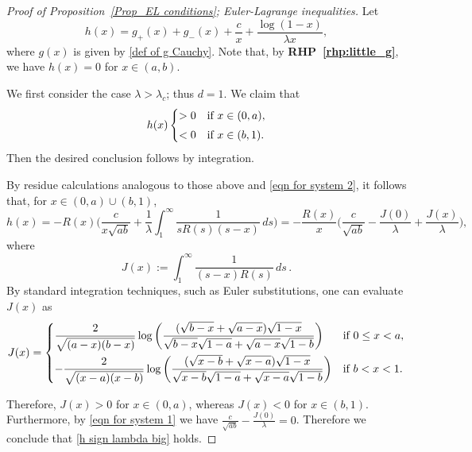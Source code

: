\documentclass{amsart}
\theoremstyle{plain}
\theoremstyle{remark}
\numberwithin{equation}{section}
\begin{document}
\begin{proof}[Proof of Proposition~\ref{Prop_EL conditions}; Euler-Lagrange inequalities] 


Let 
\begin{equation}
\label{eq:h_func}
    h(x) = g_+(x) + g_-(x) + \frac{c}{x} + \frac{\log(1-x)}{\lambda x},
\end{equation}
where $g(x)$ is given by \eqref{def of g Cauchy}. Note that, by \textbf{RHP~\ref{rhp:little_g}}, we have $h(x)=0$ for $x \in (a,b)$.

We first consider the case $\lambda > \lambda_c$; thus $d=1$.  
We claim that 
\begin{equation} \label{h sign lambda big}
h(x) \begin{cases}
>0 &\textup{if } x \in (0,a),
\smallskip 
\\
<0  &\textup{if } x \in (b,1).  
\end{cases}
\end{equation}
Then the desired conclusion follows by integration. 
 
By residue calculations analogous to those above and \eqref{eqn for system 2}, it follows that, for $x \in (0,a)\cup(b,1)$, 
\begin{equation}
  h(x) = -R(x)\bigg(\frac{c}{x\sqrt{ab}} +\frac{1}{\lambda}\int_1^\infty \frac{1}{sR(s)(s-x)}\, ds\bigg)= -\frac{R(x)}{x}\Big(\frac{c}{\sqrt{ab}} -\frac{J(0)}{\lambda} +\frac{  J(x) }{\lambda }  \Big), 
\end{equation}
where 
\begin{equation} \label{def of J}
J(x) := \int_1^\infty \frac{1}{(s-x)R(s)}\, ds\,.
\end{equation}
By standard integration techniques, such as Euler substitutions, one can evaluate $J(x)$ as 
\begin{equation}  \label{integral eval of J}
    J(x) = 
    \begin{cases}
    \displaystyle  
    \frac{2 }{\sqrt{(a-x)(b-x)}} \log\bigg( \frac{(\sqrt{b-x} + \sqrt{a-x})\sqrt{1-x} }{\sqrt{b-x}\sqrt{1-a} + \sqrt{a-x}\sqrt{1-b}}\bigg) &\textup{if } 0 \le x < a, 
    \smallskip
    \\
    \displaystyle 
    -\frac{ 2 }{\sqrt{(x-a)(x-b)}} \log\bigg( \frac{(\sqrt{x-b} + \sqrt{x-a})\sqrt{1-x} }{\sqrt{x-b}\sqrt{1-a} + \sqrt{x-a}\sqrt{1-b}}\bigg) &\textup{if } b<x<1. 
    \end{cases} 
\end{equation} 

Therefore, $J(x)>0$ for $x\in(0,a)$, whereas $J(x)<0$ for $x \in (b,1)$. Furthermore, by \eqref{eqn for system 1} we have $\frac{c}{ \sqrt{ab} }- \frac{J(0)}{\lambda}=0$.  Therefore we conclude that \eqref{h sign lambda big} holds. 


\end{proof}
\end{document}

